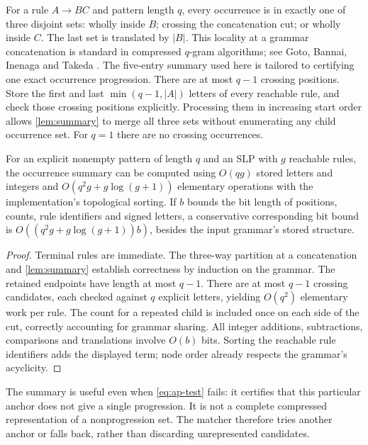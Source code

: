 For a rule $A\to BC$ and pattern length $q$, every occurrence is in exactly
one of three disjoint sets: wholly inside $B$; crossing the concatenation
cut; or wholly inside $C$. The last set is translated by $|B|$.
This locality at a grammar concatenation is standard in compressed
$q$-gram algorithms; see Goto, Bannai, Inenaga and Takeda
\cite{goto-qgrams}. The five-entry summary used here is tailored to
certifying one exact occurrence progression.
There are at most $q-1$ crossing positions. Store the first and last
$\min(q-1,|A|)$ letters of every reachable rule, and check those crossing
positions explicitly. Processing them in increasing start order allows
\cref{lem:summary} to merge all three sets without enumerating any child
occurrence set. For $q=1$ there are no crossing occurrences.

\begin{theorem}
\label{thm:summary}
For an explicit nonempty pattern of length $q$ and an SLP with $g$ reachable
rules, the occurrence summary can be computed using
$O(qg)$ stored letters and integers and
$O(q^2g+g\log(g+1))$ elementary operations with the implementation's
topological sorting. If $b$ bounds the bit length of positions, counts,
rule identifiers and signed letters, a conservative corresponding bit bound
is $O((q^2g+g\log(g+1))b)$, besides the input grammar's stored structure.
\end{theorem}
\begin{proof}
Terminal rules are immediate. The three-way partition at a concatenation
and \cref{lem:summary} establish correctness by induction on the grammar.
The retained endpoints have length at most $q-1$. There are at most $q-1$
crossing candidates, each checked against $q$ explicit letters, yielding
$O(q^2)$ elementary work per rule. The count for a repeated child is
included once on each side of the cut, correctly accounting for grammar
sharing. All integer additions, subtractions, comparisons and translations
involve $O(b)$ bits. Sorting the reachable rule identifiers adds the displayed
term; node order already respects the grammar's acyclicity.
\end{proof}

The summary is useful even when \cref{eq:ap-test} fails: it certifies that this particular
anchor does not give a single progression. It is not a complete compressed
representation of a nonprogression set. The matcher therefore tries another
anchor or falls back, rather than discarding unrepresented candidates.


